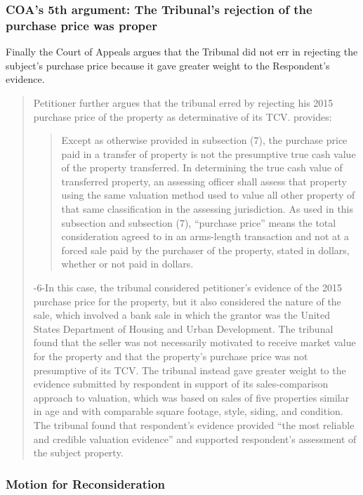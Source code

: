 \documentclass[12pt,\documentclassflag]{michiganCourtOfAppealsBrief}
\begin{document}
\subsubsection{COA's 5th argument: The Tribunal's rejection of the purchase price was proper}

Finally the Court of Appeals argues that the Tribunal did not err in rejecting the subject's purchase price because it gave greater weight to the Respondent's evidence.

\begin{quotation}
  Petitioner further argues that the tribunal erred by rejecting his 2015 purchase price of the
  property as determinative of its TCV. \cite{MCL 211.27(6)} provides:

  \begin{quote}
Except as otherwise provided in subsection (7), the purchase price paid in a
transfer of property is not the presumptive true cash value of the property
transferred. In determining the true cash value of transferred property, an assessing
officer shall assess that property using the same valuation method used to value all
other property of that same classification in the assessing jurisdiction. As used in
this subsection and subsection (7), ``purchase price'' means the total consideration
agreed to in an arms-length transaction and not at a forced sale paid by the purchaser
of the property, stated in dollars, whether or not paid in dollars.
\end{quote}

-6-In this case, the tribunal considered petitioner's evidence of the 2015 purchase price for the
property, but it also considered the nature of the sale, which involved a bank sale in which the
grantor was the United States Department of Housing and Urban Development. The tribunal found
that the seller was not necessarily motivated to receive market value for the property and that the
property's purchase price was not presumptive of its TCV. The tribunal instead gave greater
weight to the evidence submitted by respondent in support of its sales-comparison approach to
valuation, which was based on sales of five properties similar in age and with comparable square
footage, style, siding, and condition. The tribunal found that respondent's evidence provided ``the
most reliable and credible valuation evidence'' and supported respondent's assessment of the
subject property.
\end{quotation}

\subsubsection{Motion for Reconsideration}
\end{document}
